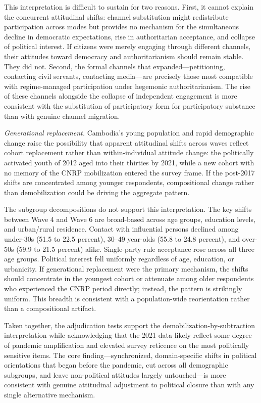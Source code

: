\documentclass[Review,times,sageh,doublespace]{sagej}
\begin{document}
This interpretation is difficult to sustain for two reasons. First, it
cannot explain the concurrent attitudinal shifts: channel substitution
might redistribute participation across modes but provides no mechanism
for the simultaneous decline in democratic expectations, rise in
authoritarian acceptance, and collapse of political interest. If
citizens were merely engaging through different channels, their
attitudes toward democracy and authoritarianism should remain stable.
They did not. Second, the formal channels that expanded---petitioning,
contacting civil servants, contacting media---are precisely those most
compatible with regime-managed participation under hegemonic
authoritarianism. The rise of these channels alongside the collapse of
independent engagement is more consistent with the substitution of
participatory form for participatory substance than with genuine channel
migration.

\emph{Generational replacement.} Cambodia's young population and rapid
demographic change raise the possibility that apparent attitudinal
shifts across waves reflect cohort replacement rather than
within-individual attitude change: the politically activated youth of
2012 aged into their thirties by 2021, while a new cohort with no memory
of the CNRP mobilization entered the survey frame. If the post-2017
shifts are concentrated among younger respondents, compositional change
rather than demobilization could be driving the aggregate pattern.

The subgroup decompositions do not support this interpretation. The key
shifts between Wave 4 and Wave 6 are broad-based across age groups,
education levels, and urban/rural residence. Contact with influential
persons declined among under-30s (51.5 to 22.5 percent), 30--49
year-olds (55.8 to 24.8 percent), and over-50s (59.9 to 21.5 percent)
alike. Single-party rule acceptance rose across all three age groups.
Political interest fell uniformly regardless of age, education, or
urbanicity. If generational replacement were the primary mechanism, the
shifts should concentrate in the youngest cohort or attenuate among
older respondents who experienced the CNRP period directly; instead, the
pattern is strikingly uniform. This breadth is consistent with a
population-wide reorientation rather than a compositional artifact.

Taken together, the adjudication tests support the
demobilization-by-subtraction interpretation while acknowledging that
the 2021 data likely reflect some degree of pandemic amplification and
elevated survey reticence on the most politically sensitive items. The
core finding---synchronized, domain-specific shifts in political
orientations that began before the pandemic, cut across all demographic
subgroups, and leave non-political attitudes largely untouched---is more
consistent with genuine attitudinal adjustment to political closure than
with any single alternative mechanism.
\end{document}
